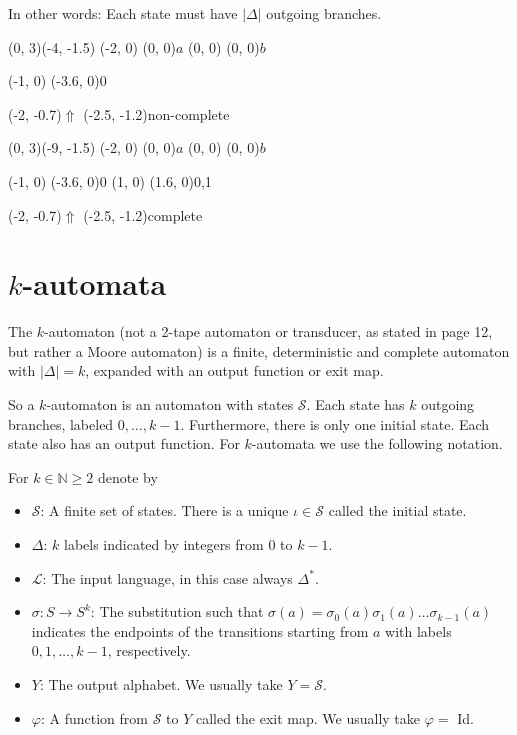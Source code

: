 \documentclass{article}
\begin{document}
In other words: Each state must have $|\Delta|$ outgoing branches.

\begin{graph}(0, 3)(-4, -1.5)
  (-2, 0) (0, 0){$a$}
  (0, 0) (0, 0){$b$}

  (-1, 0) \freetext(-3.6, 0){0}
   

  \freetext(-2, -0.7){$\Uparrow$}
  \freetext(-2.5, -1.2){non-complete}
\end{graph}
\begin{graph}(0, 3)(-9, -1.5)
  (-2, 0) (0, 0){$a$}
  (0, 0) (0, 0){$b$}

  (-1, 0) \freetext(-3.6, 0){0}
  (1, 0) \freetext(1.6, 0){0,1}
   

  \freetext(-2, -0.7){$\Uparrow$}
  \freetext(-2.5, -1.2){complete}
\end{graph}

\section{$k$-automata}
The $k$-automaton (not a 2-tape automaton or transducer, as stated in
\cite{Fogg} page 12, but rather a Moore automaton) is a finite, 
deterministic and complete automaton with $|\Delta| = k$, expanded with an 
output function or exit map.

So a $k$-automaton is an automaton with states $\mathcal{S}$. Each state has
$k$ outgoing branches, labeled $0, \ldots, k - 1$. Furthermore, there is only
one initial state. Each state also has an output function. For $k$-automata
we use the following notation.

\begin{definition}[$k$-automaton] \label{def:k-automaton}
For $k \in \mathbb{N} \ge 2$ denote by
\begin{itemize}
\item $\mathcal{S}$: A finite set of states. There is a unique 
      $\iota \in \mathcal{S}$ called the initial state.
\item $\Delta$: $k$ labels indicated by integers from 0 to $k - 1$.
\item $\mathcal{L}$: The input language, in this case always $\Delta^*$.
\item $\sigma: S \to S^k$: The substitution such that 
      $\sigma(a) = \sigma_0(a) \sigma_1(a) \ldots \sigma_{k - 1}(a)$ indicates 
      the endpoints of the transitions starting from $a$ with labels 
      $0, 1, \ldots, k - 1$, respectively.
\item $Y$: The output alphabet. We usually take $Y = \mathcal{S}$.
\item $\varphi$: A function from $\mathcal{S}$ to $Y$ called the exit map. We
      usually take $\varphi =$ Id.
\end{itemize}
\end{definition}
\end{document}
